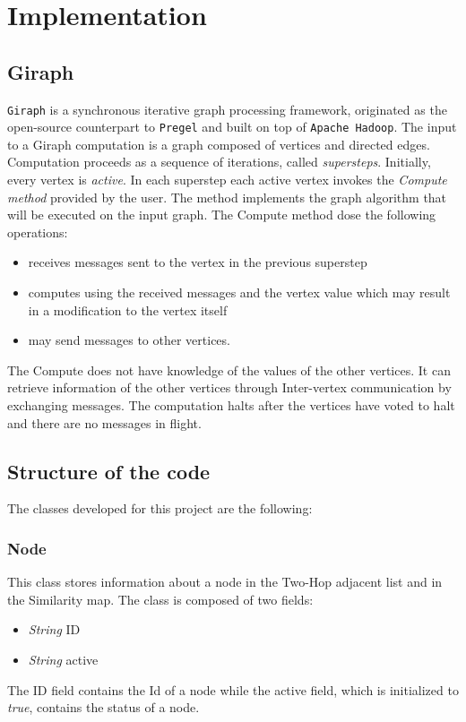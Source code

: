 \documentclass[12pt]{article}
\begin{document}
\section{Implementation}
\subsection{Giraph}
\texttt{Giraph} is a synchronous iterative graph processing framework, originated as the open-source counterpart to \texttt{Pregel} and built on top of \texttt{Apache Hadoop}.
The input to a Giraph computation is a graph composed of vertices and directed edges. Computation proceeds as a sequence of iterations, called \emph{supersteps}. Initially, every vertex is \emph{active}. In each superstep each active vertex invokes the \emph{Compute method} provided by the user. The method implements the graph algorithm that will be executed on the input graph.
The Compute method dose the following operations:
\begin{itemize}
    \item receives messages sent to the vertex in the previous superstep
    \item computes using the received messages and the vertex value which may result in a modification to the vertex itself
    \item may send messages to other vertices.
\end{itemize}
    The Compute does not have knowledge of the values of the other vertices. It can retrieve information of the other vertices through Inter-vertex communication by exchanging messages.
    The computation halts after the vertices have voted to halt and there are no messages in flight.
\subsection{Structure of the code}
The classes developed for this project are the following:
\subsubsection{Node}
    This class stores information about a node in the Two-Hop adjacent list and in the Similarity map.
    The class is composed of two fields:
    \begin{itemize}
            \item \emph{String} ID
            \item \emph{String} active
    \end{itemize}
    The ID field contains the Id of a node while the active field, which is initialized to \emph{true}, contains the status of a node.
\end{document}
